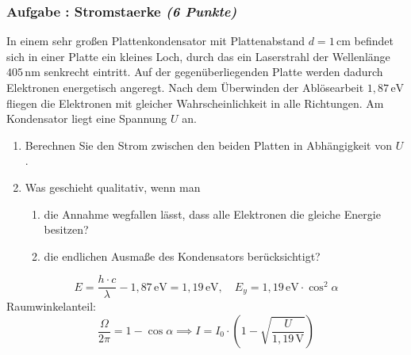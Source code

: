 \documentclass[12pt,a4paper]{article}
\newcommand{\unit}[1]{\,\mathrm{#1}}
\newenvironment{abcenum}{\renewcommand{\labelenumi}{(\alph{enumi})} \begin{enumerate}}{\end{enumerate}\renewcommand{\labelenumi}{\theenumi .}}
\newcounter{numlabel}
\newenvironment{problem}[2]{\stepcounter{numlabel} \vspace{1ex} \subsubsection*{Aufgabe \the\value{numlabel}: #1 \emph{(#2 Punkte)}} \renewcommand{\Currentlabel}{Aufgabe \the\value{numlabel}: #1}}{

}
\begin{document}
\begin{problem}{Stromstaerke}{6}
In einem sehr großen Plattenkondensator mit Plattenabstand $d=1\unit{cm}$ befindet sich in einer Platte ein kleines Loch, durch das ein Laserstrahl der Wellenlänge $405\unit{nm}$ senkrecht eintritt. Auf der gegenüberliegenden Platte werden dadurch Elektronen energetisch angeregt. Nach dem Überwinden der Ablösearbeit $1,87\unit{eV}$ fliegen die Elektronen mit gleicher Wahrscheinlichkeit in alle Richtungen. Am Kondensator liegt eine Spannung $U$ an.
\begin{abcenum}
  \item Berechnen Sie den Strom zwischen den beiden Platten in Abhängigkeit von $U$.
  \item Was geschieht qualitativ, wenn man
  \begin{enumerate}
    \item die Annahme wegfallen lässt, dass alle Elektronen die gleiche Energie besitzen?
    \item die endlichen Ausmaße des Kondensators berücksichtigt?
  \end{enumerate}
\end{abcenum}
\begin{solution}
\[
E=\frac{h\cdot c}{\lambda}-1,87\unit{eV}=1,19\unit{eV}, \quad E_y=1,19\unit{eV}\cdot \cos^2\alpha
\]
Raumwinkelanteil:
\[
\frac{\Omega}{2\pi} = 1-\cos{\alpha} \implies I=I_0\cdot\left(1-\sqrt{\frac{U}{1,19\unit{V}}}\right)
\]
\end{solution}
\end{problem}
\end{document}
